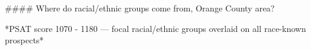 #### Where do racial/ethnic groups come from, Orange County area?

*PSAT score 1070 - 1180 — focal racial/ethnic groups overlaid on all race-known prospects*

